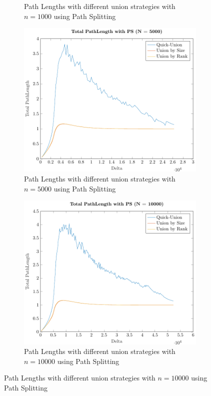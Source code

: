 \begin{figure}[ht]
\begin{subfigure}{0.32\textwidth}
        \caption{Path Lengths with different union strategies with $n = 1000$ using Path Splitting}
    \end{subfigure}%
    \hfill
    \begin{subfigure}{0.32\textwidth}
        \centering
        \includegraphics[width=\textwidth]{../images/plotPSFull5000_PathLength.pdf}
        \caption{Path Lengths with different union strategies with $n = 5000$ using Path Splitting}
    \end{subfigure}%
    \hfill
    \begin{subfigure}{0.32\textwidth}
        \centering
        \includegraphics[width=\textwidth]{../images/plotPSFull10000_PathLength.pdf}
        \caption{Path Lengths with different union strategies with $n = 10000$ using Path Splitting}
    \end{subfigure}


\end{figure}
